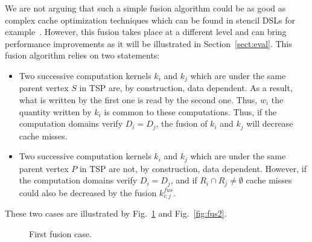 We are not arguing that such a simple fusion algorithm could be as good as complex cache optimization techniques which can be found in stencil DSLs for example~\cite{spaaTangCKLL11}. However, this fusion takes place at a different level and can bring performance improvements as it will be illustrated in Section~\ref{sect:eval}. This fusion algorithm relies on two statements:
\begin{itemize}
\item Two successive computation kernels $k_i$ and $k_j$ which are under the same parent vertex $S$ in TSP are, by construction, data dependent. As a result, what is written by the first one is read by the second one. Thus, $w_i$ the quantity written by $k_i$ is common to these computations. Thus, if the computation domains verify $D_i=D_j$, the fusion of $k_i$ and $k_j$ will decrease cache misses.
\item Two successive computation kernels $k_i$ and $k_j$ which are under the same parent vertex $P$ in TSP are not, by construction, data dependent. However, if the computation domains verify $D_i=D_j$, and if $R_i \cap R_j \neq \emptyset$ cache misses could also be decreased by the fusion $k_{i;j}^{fus}$.
\end{itemize}
These two cases are illustrated by Fig.~\ref{fig:fus1} and Fig.~\ref{fig:fus2}.

\begin{figure}[h!]
\begin{center}
\caption{First fusion case.}
\label{fig:fus1}
\end{center}
\end{figure}

